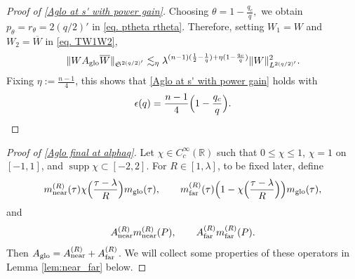 \documentclass[12pt,reqno,a4paper]{amsart}
\let\coloneq\relax
\newcommand{\coloneq}{\coloneqq}
\newcommand{\R}{{\mathbb R}}
\newcommand\eps{\epsilon}
\DeclareMathOperator{\supp}{supp}
\begin{document}
\begin{proof}[Proof of \eqref{Aglo at s' with power gain}]
Choosing
\(
  \theta=1-\frac{q_c}{q},
\)
we obtain
\(
  p_\theta=r_\theta=2(q/2)'
\)
in \eqref{eq. ptheta rtheta}.
Therefore, setting \(W_1=W\) and \(W_2=\overline{W}\) in \eqref{eq. TW1W2},
\begin{align}\label{eq:A_glo interpolated}
  \|WA_{\rm glo}\overline W\|_{\mathfrak S^{2(q/2)'}}
  \lesssim_{\eta}
  \lambda^{(n-1)(\frac{1}{2}-\frac{1}{q})+\eta(1-\frac{q_c}{q})}
  \|W\|_{L^{2(q/2)'}}^2.
\end{align}
Fixing $\eta:=\frac{n-1}{4}$, this shows that
 \eqref{Aglo at s' with power gain} holds with
\[
      \eps(q)=\frac{n-1}{4}\Big(1-\frac{q_c}{q}\Big).\qedhere
\]
  \end{proof}

\begin{proof}[Proof of \eqref{Aglo final at alphaq}]
Let \(\chi\in C_c^\infty(\R)\) such that \(0\leq \chi\leq 1\), \(\chi=1\) on \([-1,1]\), and \(\supp\chi\subset [-2,2]\). For $R\in [1,\lambda]$, to be fixed later, define
  \[
    m_{\rm near}^{(R)}(\tau)\coloneq\chi\Big(\frac{\tau-\lambda}{R}\Big)m_{\rm glo}(\tau),
    \qquad
    m_{\rm far}^{(R)}(\tau)\coloneq\Big(1-\chi\Big(\frac{\tau-\lambda}{R}\Big)\Big)m_{\rm glo}(\tau),
  \]
  and
  \begin{equation}\label{def:Anear-far}
    A_{\rm near}^{(R)}\coloneq m_{\rm near}^{(R)}(P),
    \qquad
    A_{\rm far}^{(R)}\coloneq m_{\rm far}^{(R)}(P).
  \end{equation}
Then \(A_{\rm glo}=A_{\rm near}^{(R)}+A_{\rm far}^{(R)}\). We will collect some properties of these operators in Lemma \ref{lem:near_far} below.


\end{proof}
\end{document}
